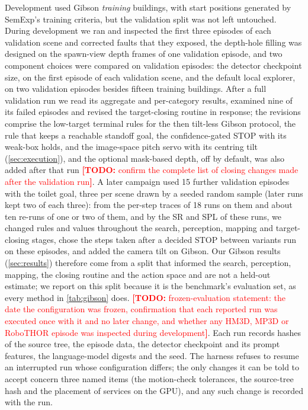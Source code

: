 \documentclass[10pt]{article}
\newcommand{\TODO}[1]{\textcolor{red}{\textbf{[TODO:} #1\textbf{]}}}
\newcommand{\SR}{\textsc{SR}\xspace}
\newcommand{\SPL}{\textsc{SPL}\xspace}
\begin{document}
Development used Gibson \emph{training} buildings, with start positions generated by SemExp's training criteria, but
the validation split was not left untouched. During development we ran and inspected the first three episodes of
each validation scene and corrected faults that they exposed, the depth-hole filling was designed on the
spawn-view depth frames of one validation episode, and two component choices were compared on validation episodes:
the detector checkpoint size, on the first episode of each validation scene, and the default local explorer, on two
validation episodes besides fifteen training buildings. After a full validation run we read its aggregate and
per-category results, examined nine of its failed episodes and revised the target-closing routine in response; the
revisions comprise the low-target terminal rules for the then tilt-less Gibson protocol, the rule that keeps a reachable
standoff goal, the confidence-gated STOP with its weak-box holds, and the image-space pitch servo with its centring
tilt (\cref{sec:execution}), and the optional mask-based depth, off by default, was also added after that run
\TODO{confirm the complete list of closing changes made after the validation run}. A later campaign used 15 further
validation episodes with the toilet goal, three per scene drawn by a seeded random sample (later runs kept two of each
three): from the per-step traces of 18 runs on them and about ten re-runs of one or two of them, and by the \SR and \SPL of
these runs, we changed rules and values throughout the search, perception, mapping and target-closing stages, chose the steps taken after a decided
STOP between variants run on these episodes, and added the camera tilt on Gibson. Our Gibson results
(\cref{sec:results}) therefore come from a split that informed the search, perception, mapping, the closing routine and the
action space and are not a held-out estimate; we report on this split because it is
the benchmark's evaluation set, as every method in \cref{tab:gibson} does. \TODO{frozen-evaluation statement: the date the configuration was frozen, confirmation that each reported run was
executed once with it and no later change, and whether any HM3D, MP3D or RoboTHOR episode was inspected during
development}. Each run records hashes of the source tree, the episode data, the detector checkpoint and its prompt
features, the language-model digests and the seed. The harness refuses to resume an interrupted run whose
configuration differs; the only changes it can be told to accept concern three named items (the motion-check
tolerances, the source-tree hash and the placement of services on the GPU), and any such change is recorded with the
run.
\end{document}

